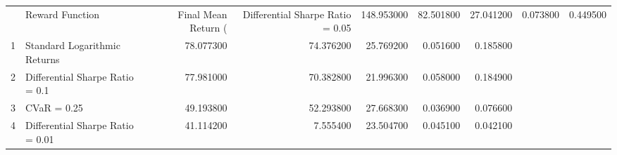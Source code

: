 \begin{tabular}{llrrrrr}
\toprule
 & Reward Function & Final Mean Return (%
 & Differential Sharpe Ratio = 0.05 & 148.953000 & 82.501800 & 27.041200 & 0.073800 & 0.449500 \\
1 & Standard Logarithmic Returns & 78.077300 & 74.376200 & 25.769200 & 0.051600 & 0.185800 \\
2 & Differential Sharpe Ratio = 0.1 & 77.981000 & 70.382800 & 21.996300 & 0.058000 & 0.184900 \\
3 & CVaR = 0.25 & 49.193800 & 52.293800 & 27.668300 & 0.036900 & 0.076600 \\
4 & Differential Sharpe Ratio = 0.01 & 41.114200 & 7.555400 & 23.504700 & 0.045100 & 0.042100 \\
\bottomrule
\end{tabular}
